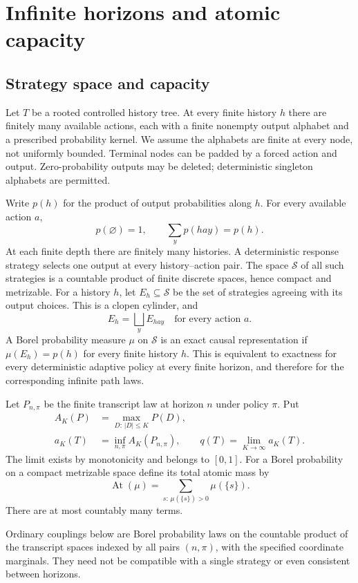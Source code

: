 \documentclass[11pt,a4paper]{article}
\theoremstyle{definition}\newtheorem{definition}[theorem]{Definition}
\theoremstyle{remark}\newtheorem{remark}[theorem]{Remark}
\newcommand{\cS}{\mathcal S}
\newcommand{\At}{\operatorname{At}}
\numberwithin{equation}{section}
\begin{document}
\section{Infinite horizons and atomic capacity}\label{sec:infinite}\subsection{Strategy space and capacity}
Let $T$ be a rooted controlled history tree. At every finite history $h$
there are finitely many available actions, each with a finite nonempty
output alphabet and a prescribed probability kernel. We assume the
alphabets are finite at every node, not uniformly bounded. Terminal nodes
can be padded by a forced action and output. Zero-probability outputs may
be deleted; deterministic singleton alphabets are permitted.

Write $p(h)$ for the product of output probabilities along $h$.
For every available action $a$,
\[
 p(\varnothing)=1,\qquad \sum_y p(hay)=p(h).
\]
At each finite depth there are finitely many histories. A deterministic
response strategy selects one output at every history--action pair.
The space $\cS$ of all such strategies is a countable product of finite
discrete spaces, hence compact and metrizable. For a history $h$, let
$E_h\subseteq\cS$ be the set of strategies agreeing with its output
choices. This is a clopen cylinder, and
\[
 E_h=\bigsqcup_y E_{hay}\quad\text{for every action }a.
\]
A Borel probability measure $\mu$ on $\cS$ is an exact causal
representation if $\mu(E_h)=p(h)$ for every finite history $h$.
This is equivalent to exactness for every deterministic adaptive policy
at every finite horizon, and therefore for the corresponding infinite
path laws.

Let $P_{n,\pi}$ be the finite transcript law at horizon $n$ under policy
$\pi$. Put
\begin{align}
 A_K(P)&=\max_{D:\,|D|\le K}P(D),\\
 a_K(T)&=\inf_{n,\pi} A_K(P_{n,\pi}),\qquad
 q(T)=\lim_{K\to\infty}a_K(T).\label{inf:eq:q}
\end{align}
The limit exists by monotonicity and belongs to $[0,1]$.
For a Borel probability on a compact metrizable space define its total
atomic mass by
\[
 \At(\mu)=\sum_{s:\,\mu(\{s\})>0}\mu(\{s\}).
\]
There are at most countably many terms.

Ordinary couplings below are Borel probability laws on the countable
product of the transcript spaces indexed by all pairs $(n,\pi)$, with
the specified coordinate marginals. They need not be compatible with a
single strategy or even consistent between horizons.
\end{document}
